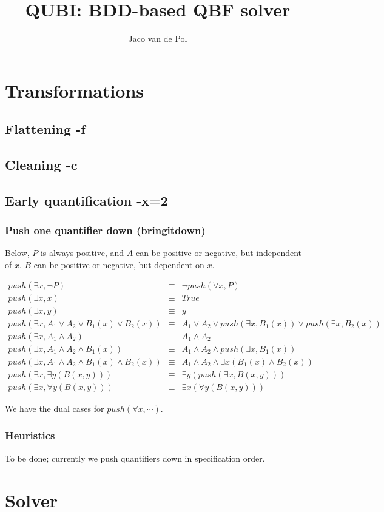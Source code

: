 \documentclass{article}
\title{QUBI: BDD-based QBF solver}
\author{Jaco van de Pol}
\begin{document}
\section{Transformations}
\subsection{Flattening -f}
\subsection{Cleaning -c}
\subsection{Early quantification -x=2}
\subsubsection{Push one quantifier down (bringitdown)}
Below, $P$ is always positive, and $A$ can be positive or negative,
but independent of $x$. $B$ can be positive or negative, but dependent on $x$.

\begin{eqnarray*}
    push(\exists x, \neg P) & \equiv & \neg push(\forall x, P) \\
    push(\exists x, x) & \equiv & True \\
    push(\exists x, y) & \equiv & y \\
    push(\exists x, A_1 \vee A_2 \vee B_1(x) \vee B_2(x)) & \equiv & 
        A_1 \vee A_2 \vee push(\exists x, B_1(x))\vee push(\exists x, B_2(x))\\
    push(\exists x, A_1 \wedge A_2) & \equiv & A_1 \wedge A_2 \\
    push(\exists x, A_1 \wedge A_2 \wedge B_1(x)) & \equiv & 
        A_1 \wedge A_2 \wedge push(\exists x, B_1(x))\\
    push(\exists x, A_1 \wedge A_2 \wedge B_1(x) \wedge B_2(x)) & \equiv & 
        A_1 \wedge A_2 \wedge \exists x (B_1(x) \wedge B_2(x))\\
    push(\exists x, \exists y (B(x,y))) & \equiv & 
        \exists y (push(\exists x, B(x,y)))\\
    push(\exists x, \forall y (B(x,y))) & \equiv & 
        \exists x (\forall y(B(x,y)))
\end{eqnarray*}

We have the dual cases for $push(\forall x, \cdots)$.

\subsubsection{Heuristics}
To be done; currently we push quantifiers down in specification order.
\section{Solver}
\end{document}
